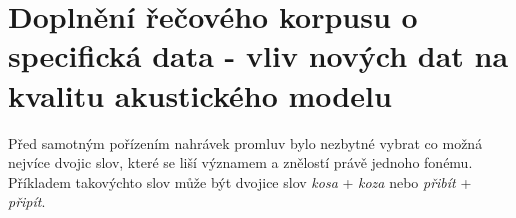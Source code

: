 \section{Doplnění řečového korpusu o specifická data - vliv nových dat na kvalitu akustického modelu}
\label{chap:realisation:corpus}

Před samotným pořízením nahrávek promluv bylo nezbytné vybrat co možná nejvíce dvojic slov, které se liší významem a znělostí právě jednoho fonému.
Příkladem takovýchto slov může být dvojice slov \textit{kosa} + \textit{koza} nebo \textit{přibít} + \textit{připít}.




